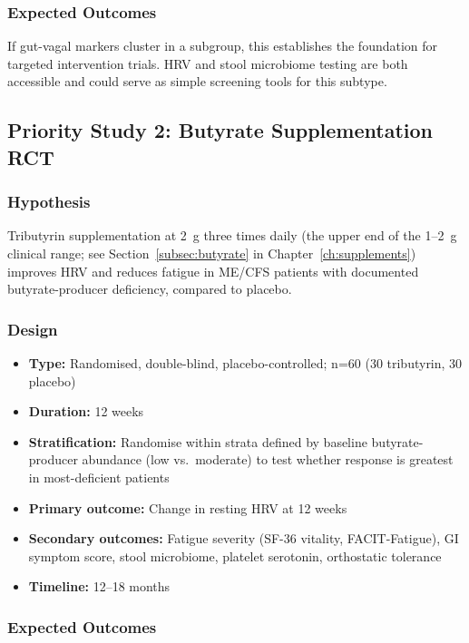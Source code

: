 \subsubsection{Expected Outcomes}

If gut-vagal markers cluster in a subgroup, this establishes the foundation for targeted intervention trials. HRV and stool microbiome testing are both accessible and could serve as simple screening tools for this subtype.

\subsection{Priority Study 2: Butyrate Supplementation RCT}

\subsubsection{Hypothesis}

Tributyrin supplementation at 2~g three times daily (the upper end of the 1--2~g clinical range; see Section~\ref{subsec:butyrate} in Chapter~\ref{ch:supplements}) improves HRV and reduces fatigue in ME/CFS patients with documented butyrate-producer deficiency, compared to placebo.

\subsubsection{Design}
\begin{itemize}
    \item \textbf{Type:} Randomised, double-blind, placebo-controlled; n=60 (30 tributyrin, 30 placebo)
    \item \textbf{Duration:} 12 weeks
    \item \textbf{Stratification:} Randomise within strata defined by baseline butyrate-producer abundance (low vs.\ moderate) to test whether response is greatest in most-deficient patients
    \item \textbf{Primary outcome:} Change in resting HRV at 12 weeks
    \item \textbf{Secondary outcomes:} Fatigue severity (SF-36 vitality, FACIT-Fatigue), GI symptom score, stool microbiome, platelet serotonin, orthostatic tolerance
    \item \textbf{Timeline:} 12--18 months
\end{itemize}

\subsubsection{Expected Outcomes}

